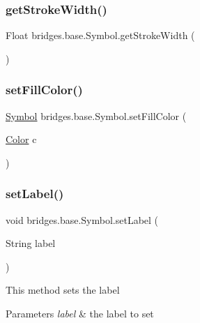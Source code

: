 \subsubsection{\texorpdfstring{get\+Stroke\+Width()}{getStrokeWidth()}}
{\footnotesize\ttfamily Float bridges.\+base.\+Symbol.\+get\+Stroke\+Width (\begin{DoxyParamCaption}{ }\end{DoxyParamCaption})}

\mbox{\label{classbridges_1_1base_1_1_symbol_ab9fa8c9df32ee0ded33146ef344943d7}} 
\subsubsection{\texorpdfstring{set\+Fill\+Color()}{setFillColor()}}
{\footnotesize\ttfamily \mbox{\hyperlink{classbridges_1_1base_1_1_symbol}{Symbol}} bridges.\+base.\+Symbol.\+set\+Fill\+Color (\begin{DoxyParamCaption}\item[{\mbox{\hyperlink{classbridges_1_1base_1_1_color}{Color}}}]{c }\end{DoxyParamCaption})}

\mbox{\label{classbridges_1_1base_1_1_symbol_af6b944374cbd34334caac28d948a3f21}} 
\subsubsection{\texorpdfstring{set\+Label()}{setLabel()}}
{\footnotesize\ttfamily void bridges.\+base.\+Symbol.\+set\+Label (\begin{DoxyParamCaption}\item[{String}]{label }\end{DoxyParamCaption})}

This method sets the label


\begin{DoxyParams}{Parameters}
{\em label} & the label to set \\
\hline
\end{DoxyParams}
\mbox{\label{classbridges_1_1base_1_1_symbol_ab378b9b3c5ab203fbb4661697f7f7e0a}} 
